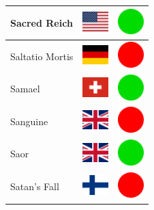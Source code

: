 \documentclass[12pt, a4paper, twoside]{report}
\begin{document}
\begin{center}
\begin{longtable}{|p{5cm}|p{2cm}|p{2cm}|}
 Sacred Reich                                               & \includegraphics[width=1cm]{../4x3/us} &   \includegraphics[width=1cm]{../likes/y} \\ \hline
 Saltatio Mortis                                            & \includegraphics[width=1cm]{../4x3/de} &   \includegraphics[width=1cm]{../likes/n} \\ \hline
 Samael                                                     & \includegraphics[width=1cm]{../4x3/ch} &   \includegraphics[width=1cm]{../likes/y} \\ \hline
 Sanguine                                                   & \includegraphics[width=1cm]{../4x3/gb} &   \includegraphics[width=1cm]{../likes/n} \\ \hline
 Saor                                                       & \includegraphics[width=1cm]{../4x3/gb} &   \includegraphics[width=1cm]{../likes/y} \\ \hline
 Satan's Fall                                               & \includegraphics[width=1cm]{../4x3/fi} &   \includegraphics[width=1cm]{../likes/n} \\ \hline

\end{longtable}
\end{center}
\end{document}
